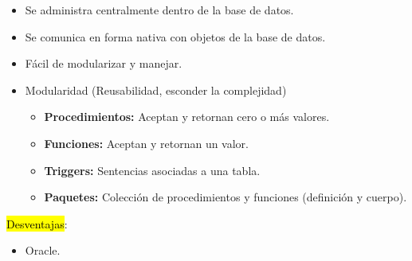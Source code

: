 \documentclass{templateNote}
\begin{document}
\begin{itemize}
    \item Se administra centralmente dentro de la base de datos.
    
    \item Se comunica en forma nativa con objetos de la base de datos.
    
    \item Fácil de modularizar y manejar.
    
    \item Modularidad (Reusabilidad, esconder la complejidad)
    \begin{itemize}
        \item \textbf{Procedimientos:} Aceptan y retornan cero o más valores.
        \item \textbf{Funciones:} Aceptan y retornan un valor.
        \item \textbf{Triggers:} Sentencias asociadas a una tabla.
        \item \textbf{Paquetes:} Colección de procedimientos y funciones (definición y cuerpo).
    \end{itemize} 

\end{itemize}
\hl{Desventajas}:
\begin{itemize}
    \item Oracle.
\end{itemize}
\end{document}
